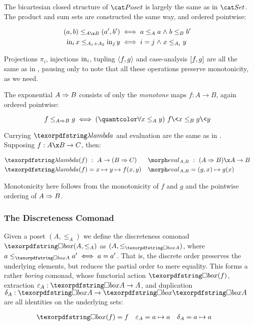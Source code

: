 The bicartesian closed structure of $\Poset$ is largely the same as in $\Set$.
%
The product and sum sets are constructed the same way, and ordered pointwise:

\begin{align*}
  (a,b) \le_{A \x B} (a',b') &\iff a \le_A a \wedge b \le_B b'\\
  \inj i x \le_{A_1 + A_2} \inj j y &\iff i = j \wedge x \le_{A_i} y
\end{align*}

\noindent Projections $\pi_i$, injections $\mathrm{in}_i$, tupling $\langle{f,g}\rangle$ and
case-analysis $[{f,g}]$ are all the same as in \Set, pausing only to note
that all these operations preserve monotonicity, as we need.

The exponential $A \Rightarrow B$ consists of only the \emph{monotone} maps $f : A \to
B$, again ordered pointwise:

\[ f \le_{\expO A B} g \iff \fa{x \le_A y} f\<x \le_B g\<y \]

\noindent
Currying $\fn$ and evaluation are the same as in \Set. Supposing $f : A \x B \to
C$, then:

\begin{align*}
  \fn(f) &\isa A \to (\expO B C) &
  \eval_{A,B} &\isa (\expO A B) \x A \to B
  \\
  \fn(f) &= x \mapsto y \mapsto f(x,y) &
  \eval_{A,B} &= (g,x) \mapsto g(x)
\end{align*}

\noindent
Monotonicity here follows from the monotonicity of $f$ and $g$ and the pointwise ordering of $A \Rightarrow B$.


\subsubsection{The Discreteness Comonad}

Given a poset $(A, \leq_A)$ we define the discreteness comonad $\iso(A, \leq_A)$
as $(A, \leq_{\iso A})$, where \( a \leq_{\iso A} a' \iff a = a' \).
%
That is, the discrete order preserves the underlying elements, but reduces the
partial order to mere equality.
%
This forms a rather \emph{boring} comonad, whose functorial action $\iso(f)$, extraction $\varepsilon_A : \iso A \to A$, and duplication $\delta_A : \iso A \to \iso \iso A$ are all identities on the underlying sets:

\begin{align*}
  \iso(f) &= f & \varepsilon_A &= a \mapsto a & \delta_A &= a \mapsto a
\end{align*}

